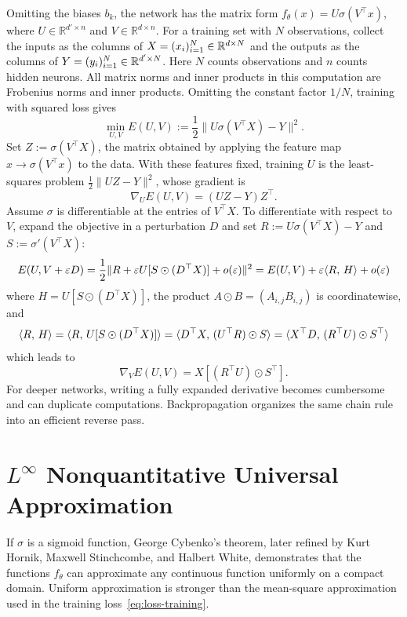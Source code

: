 Omitting the biases $b_k$, the network has the matrix form $f_\theta(x) = U \sigma(V^\top x)$, where $U \in \mathbb{R}^{d' \times n}$ and $V \in \mathbb{R}^{d \times n}$.
For a training set with $N$ observations, collect the inputs as the columns of $X = (x_i)_{i=1}^N \in \mathbb{R}^{d \times N}$
and the outputs as the columns of $Y=(y_i)_{i=1}^N\in\mathbb{R}^{d'\times N}$. Here $N$ counts observations and $n$ counts hidden neurons. All matrix norms and inner products in this computation are Frobenius norms and inner products. Omitting the constant factor $1/N$, training with squared loss gives
$$
	\min_{U,V} E(U,V) := \frac{1}{2}\| U \sigma(V^\top X) - Y \|^2.
$$
Set $Z := \sigma(V^\top X)$, the matrix obtained by applying the feature map $x \to \sigma(V^\top x)$ to the data. With these features fixed, training $U$ is the least-squares problem $\frac{1}{2}\|U Z - Y\|^2$, whose gradient is
$$
	\nabla_U E(U,V) = (UZ-Y)Z^\top.
$$
Assume $\sigma$ is differentiable at the entries of $V^\top X$. To differentiate with respect to $V$, expand the objective in a perturbation $D$ and set $R := U \sigma(V^\top X) - Y$ and $S := \sigma'(V^\top X)$:
$$
	E(U,V + \varepsilon D) =\frac12\|R+\varepsilon U[S\odot(D^\top X)]+o(\varepsilon)\|^2 = E(U,V) +\varepsilon\langle R,\,H\rangle+o(\varepsilon)
$$
where $H=U[S\odot(D^\top X)]$, the product $A \odot B = (A_{i,j} B_{i,j})$ is coordinatewise, and
$$
	\langle R,\,H\rangle = \langle R,\, U [S \odot (D^\top X)] \rangle	
	= \langle D^\top X,\, (U^\top R) \odot S\rangle
	= \langle X^\top D,\, (R^\top U) \odot S^\top\rangle
$$
which leads to
$$
	\nabla_V E(U,V) = X [ (R^\top U) \odot S^\top ].
$$
For deeper networks, writing a fully expanded derivative becomes cumbersome and can duplicate computations. Backpropagation organizes the same chain rule into an efficient reverse pass.



\section{\texorpdfstring{$L^\infty$}{Uniform} Nonquantitative Universal Approximation}

If $\sigma$ is a sigmoid function, George Cybenko's theorem, later refined by Kurt Hornik, Maxwell Stinchcombe, and Halbert White, demonstrates that the functions $f_\theta$ can approximate any continuous function uniformly on a compact domain. Uniform approximation is stronger than the mean-square approximation used in the training loss~\eqref{eq:loss-training}.

